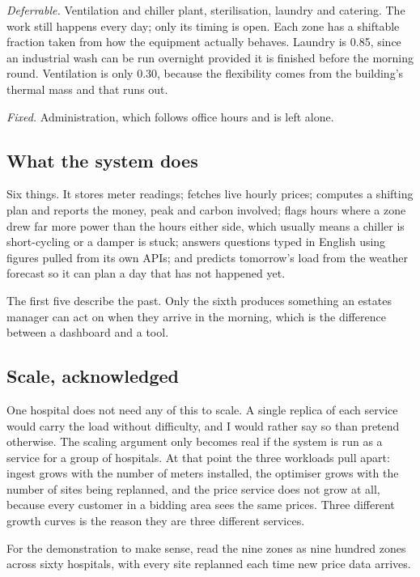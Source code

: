 \documentclass[conference]{IEEEtran}
\begin{document}
\emph{Deferrable.} Ventilation and chiller plant, sterilisation, laundry and
catering. The work still happens every day; only its timing is open. Each zone
has a shiftable fraction taken from how the equipment actually behaves. Laundry
is 0.85, since an industrial wash can be run overnight provided it is finished
before the morning round. Ventilation is only 0.30, because the flexibility
comes from the building's thermal mass and that runs out.

\emph{Fixed.} Administration, which follows office hours and is left alone.

\subsection{What the system does}

Six things. It stores meter readings; fetches live hourly prices; computes a
shifting plan and reports the money, peak and carbon involved; flags hours where
a zone drew far more power than the hours either side, which usually means a
chiller is short-cycling or a damper is stuck; answers questions typed in
English using figures pulled from its own APIs; and predicts tomorrow's load
from the weather forecast so it can plan a day that has not happened yet.

The first five describe the past. Only the sixth produces something an estates
manager can act on when they arrive in the morning, which is the difference
between a dashboard and a tool.

\subsection{Scale, acknowledged}

One hospital does not need any of this to scale. A single replica of each
service would carry the load without difficulty, and I would rather say so than
pretend otherwise. The scaling argument only becomes real if the system is run
as a service for a group of hospitals. At that point the three workloads pull
apart: ingest grows with the number of meters installed, the optimiser grows
with the number of sites being replanned, and the price service does not grow at
all, because every customer in a bidding area sees the same prices. Three
different growth curves is the reason they are three different services.

For the demonstration to make sense, read the nine zones as nine hundred zones
across sixty hospitals, with every site replanned each time new price data
arrives.
\end{document}
